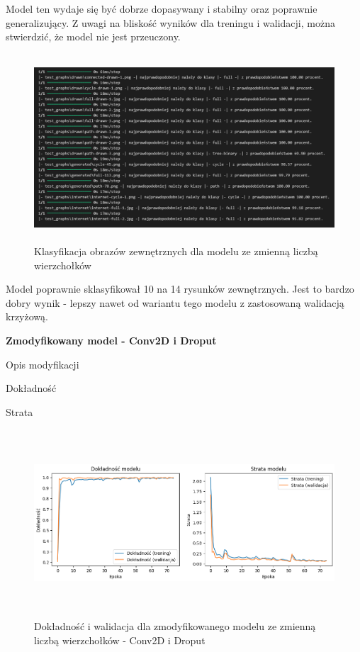 Model ten wydaje się być dobrze dopasywany i stabilny oraz poprawnie generalizujący.
Z uwagi na bliskość wyników dla treningu i walidacji, można stwierdzić, że model nie jest przeuczony.

\begin{figure}[ht]
	\centering
	\includegraphics[height=7cm]{resources/tests/images/v3/multiple_edges_txt.png}
	\caption{Klasyfikacja obrazów zewnętrznych dla modelu ze zmienną liczbą wierzchołków}
	\label{Fig:tests-var-0b}
\end{figure}
\FloatBarrier

Model poprawnie sklasyfikował 10 na 14 rysunków zewnętrznych.
Jest to bardzo dobry wynik - lepszy nawet od wariantu tego modelu z zastosowaną walidacją krzyżową.

\textbf{Zmodyfikowany model - Conv2D i Droput}

Opis modyfikacji %

Dokładność %

Strata %

\begin{figure}[ht]
	\centering
	\includegraphics[height=7cm]{resources/tests/images/v4/multiple_edges_1_img.png}
	\caption{Dokładność i walidacja dla zmodyfikowanego modelu ze zmienną liczbą wierzchołków - Conv2D i Droput}
	\label{Fig:tests-var-1a}
\end{figure}
\FloatBarrier

